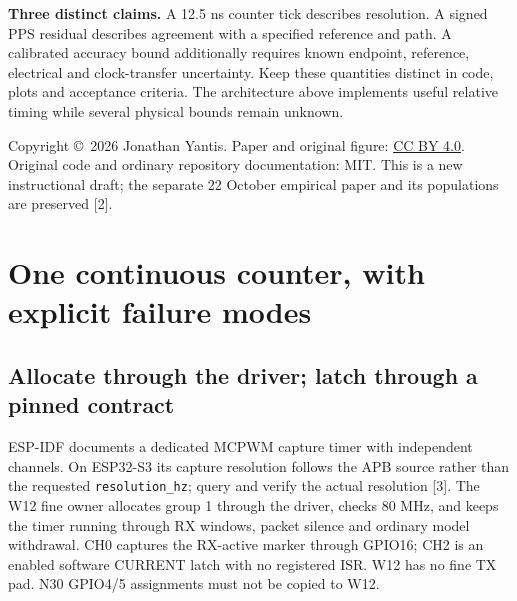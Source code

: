 \documentclass[10pt,letterpaper]{article}
\newcommand{\src}[1]{\nolinkurl{#1}}
\begin{document}
\begin{center}
\end{center}
\vspace{-5pt}
\textbf{Three distinct claims.} A 12.5 ns counter tick describes resolution. A signed PPS residual describes agreement with a specified reference and path. A calibrated accuracy bound additionally requires known endpoint, reference, electrical and clock-transfer uncertainty. Keep these quantities distinct in code, plots and acceptance criteria. The architecture above implements useful relative timing while several physical bounds remain unknown.

{\footnotesize Copyright \copyright\ 2026 Jonathan Yantis. Paper and original figure: \href{https://creativecommons.org/licenses/by/4.0/}{CC BY 4.0}. Original code and ordinary repository documentation: MIT. This is a new instructional draft; the separate 22 October empirical paper and its populations are preserved [2].}
\newpage
\section{One continuous counter, with explicit failure modes}
\subsection{Allocate through the driver; latch through a pinned contract}
ESP-IDF documents a dedicated MCPWM capture timer with independent channels. On ESP32-S3 its capture resolution follows the APB source rather than the requested \src{resolution_hz}; query and verify the actual resolution [3]. The W12 fine owner allocates group 1 through the driver, checks 80 MHz, and keeps the timer running through RX windows, packet silence and ordinary model withdrawal. CH0 captures the RX-active marker through GPIO16; CH2 is an enabled software CURRENT latch with no registered ISR. W12 has no fine TX pad. N30 GPIO4/5 assignments must not be copied to W12.
\end{document}
